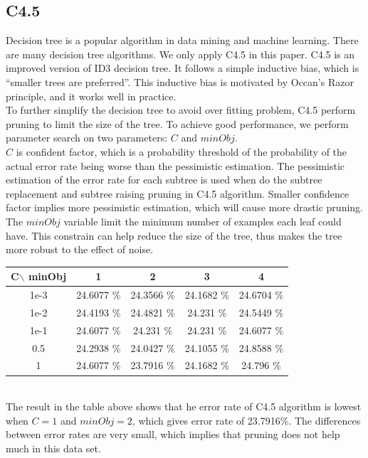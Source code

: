 \documentclass[a4paper,11pt]{article}
\begin{document}
\subsection{C4.5}
Decision tree is a popular algorithm in data mining and machine learning. There are many decision tree algorithms. We only apply C4.5 in this paper. C4.5 is an improved version of ID3 decision tree. It follows a simple inductive bias, which is ``smaller trees are preferred''. This inductive bias is motivated by Occan's Razor principle, and it works well in practice.\\
To further simplify the decision tree to avoid over fitting problem, C4.5 perform pruning to limit the size of the tree. To achieve good performance, we perform parameter search on two parameters: $C$ and $minObj$. \\
$C$ is confident factor, which is a probability threshold of the probability of the actual error rate being worse than the pessimistic estimation\cite{Morgan.Kaufmann}. The pessimistic estimation of the error rate for each subtree is used when do the subtree replacement and subtree raising pruning in C4.5 algorithm. Smaller confidence factor implies more pessimistic estimation, which will cause more drastic pruning.\\
The $minObj$ variable limit the minimum number of examples each leaf could have. This constrain can help reduce the size of the tree, thus makes the tree more robust to the effect of noise.
\vspace{0.5cm}\\
\begin{tabular}{c|c c c c}
C$\backslash$ minObj	&1		&2		&3		&4\\
\hline \hline
1e-3 	&24.6077 \%	&24.3566 \%	&24.1682 \%	 &24.6704 \%\\
1e-2	&24.4193 \%	 &24.4821 \%	&24.231  \%	 &24.5449 \%\\
1e-1	&24.6077 \%	&24.231  \%	&24.231  \%	 &24.6077 \%\\
0.5 &24.2938 \%     &24.0427 \% &24.1055 \%  &24.8588 \%\\
1	&24.6077 \%	&23.7916 \%	&24.1682 \%	 &24.796  \%\\
\end{tabular}
\vspace{0.5cm}\\
The result in the table above shows that he error rate of C4.5 algorithm is lowest when $C=1$ and $minObj=2$, which gives error rate of 23.7916\%. The differences between error rates are very small, which implies that pruning does not help much in this data set.\\
\end{document}
